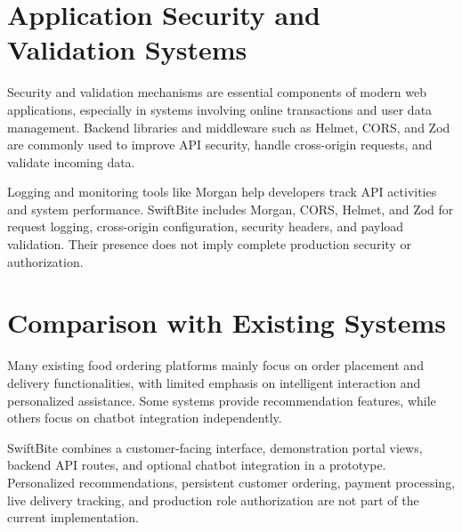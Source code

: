\section{Application Security and Validation Systems}

Security and validation mechanisms are essential components of modern web applications, especially in systems involving online transactions and user data management. Backend libraries and middleware such as Helmet, CORS, and Zod are commonly used to improve API security, handle cross-origin requests, and validate incoming data.

Logging and monitoring tools like Morgan help developers track API activities and system performance. SwiftBite includes Morgan, CORS, Helmet, and Zod for request logging, cross-origin configuration, security headers, and payload validation. Their presence does not imply complete production security or authorization.

\section{Comparison with Existing Systems}

Many existing food ordering platforms mainly focus on order placement and delivery functionalities, with limited emphasis on intelligent interaction and personalized assistance. Some systems provide recommendation features, while others focus on chatbot integration independently.

SwiftBite combines a customer-facing interface, demonstration portal views, backend API routes, and optional chatbot integration in a prototype. Personalized recommendations, persistent customer ordering, payment processing, live delivery tracking, and production role authorization are not part of the current implementation.